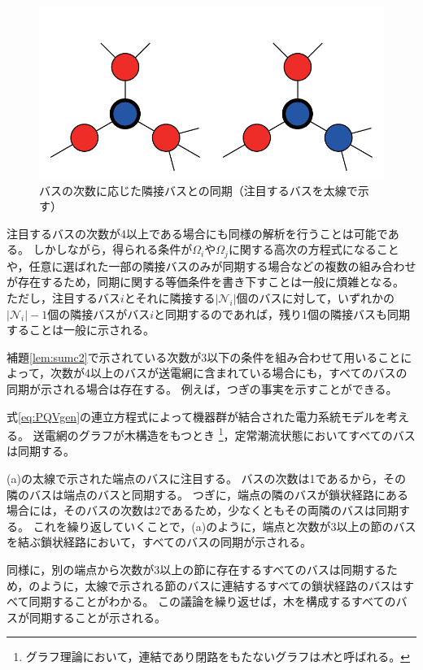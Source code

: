 \documentclass[tombow,dvipdfmx]{corona-a5-1.1}
\begin{document}
\begin{figure}[t]
{\begin{minipage}{0.3\linewidth}
  \end{minipage}
  \label{fig:N2}
  \begin{minipage}{0.3\linewidth}
    \centering
    \includegraphics[width = .60\linewidth]{figs/3degbus}
  \end{minipage}
  \caption{バスの次数に応じた隣接バスとの同期（注目するバスを太線で示す）}
  \label{fig:bussync}
  }
\end{figure}

注目するバスの次数が4以上である場合にも同様の解析を行うことは可能である。
しかしながら，得られる条件が$\Omega_i$や$\Omega_j$に関する高次の方程式になることや，任意に選ばれた一部の隣接バスのみが同期する場合などの複数の組み合わせが存在するため，同期に関する等価条件を書き下すことは一般に煩雑となる。
ただし，注目するバス$i$とそれに隣接する$|\mathcal{N}_i|$個のバスに対して，いずれかの$|\mathcal{N}_i |-1$個の隣接バスがバス$i$と同期するのであれば，残り1個の隣接バスも同期することは一般に示される。

補題\ref{lem:sumc2}で示されている次数が3以下の条件を組み合わせて用いることによって，次数が4以上のバスが送電網に含まれている場合にも，すべてのバスの同期が示される場合は存在する。
例えば，つぎの事実を示すことができる。

\begin{定理}[木構造の送電網におけるバスの同期]
\label{thm:tree}
式\ref{eq:PQVgen}の連立方程式によって機器群が結合された電力系統モデルを考える。
送電網のグラフが木構造をもつとき
\footnote{
グラフ理論において，連結であり閉路をもたないグラフは\emph{木}と呼ばれる。
}，定常潮流状態においてすべてのバスは同期する。
\end{定理}

\begin{証明}
(a)の太線で示された端点のバスに注目する。
バスの次数は1であるから，その隣のバスは端点のバスと同期する。
つぎに，端点の隣のバスが鎖状経路にある場合には，そのバスの次数は2であるため，少なくともその両隣のバスは同期する。
これを繰り返していくことで，(a)のように，端点と次数が3以上の節のバスを結ぶ鎖状経路において，すべてのバスの同期が示される。

同様に，別の端点から次数が3以上の節に存在するすべてのバスは同期するため，のように，太線で示される節のバスに連結するすべての鎖状経路のバスはすべて同期することがわかる。
この議論を繰り返せば，木を構成するすべてのバスが同期することが示される。
\end{証明}
\end{document}
